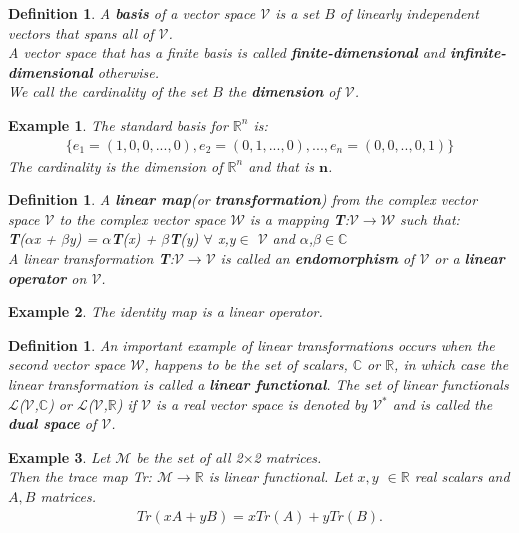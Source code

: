 \documentclass[12pt,a4paper]{article}
\newtheorem{defn}[thm]{Definition}
\newtheorem{exmp}{Example}[section]
\begin{document}
\begin{defn}
A \textbf{basis} of a vector space $\mathcal{V}$ is a set $B$ of linearly independent vectors that spans all of $\mathcal{V}$. \\A vector space that has a finite basis is called \textbf{finite-dimensional} and \textbf{infinite-dimensional} otherwise. \\We call the cardinality of the set $B$ the \textbf{dimension} of $\mathcal{V}$.
\end{defn}
\begin{exmp}
The standard basis for $\mathbb{R}^n$ is:
\begin{align*}
\{ e_1 = (1, 0, 0, ... , 0), e_2 = (0, 1, ... , 0), ... , e_n=(0,0,..,0, 1) \}
\end{align*}
The cardinality is the dimension of $\mathbb{R}^n$ and that is $\textbf{n}$.
\end{exmp}
\begin{defn}
A \textbf{linear map}(or \textbf{transformation}) from the complex vector space $\mathcal{V}$ to the complex vector space $\mathcal{W}$ is a mapping \textbf{T}:$\mathcal{V}$$\to$$\mathcal{W}$ such that:\\
\hspace{1cm} \textbf{T}($\alpha$x + $\beta$y) = $\alpha$\textbf{T}(x) + $\beta$\textbf{T}(y) $\forall$ x,y$\in$ $\mathcal{V}$ and $\alpha$,$\beta$$\in$$\mathbb{C}$\\
A linear transformation \textbf{T}:$\mathcal{V}$$\to$$\mathcal{V}$ is called an \textbf{endomorphism} of $\mathcal{V}$ or a \textbf{linear operator} on $\mathcal{V}$.
\end{defn}
\begin{exmp}
The identity map is a linear operator.
\end{exmp}
\begin{defn}
An important example of linear transformations occurs when the second vector space $\mathcal{W}$, happens to be the set of scalars, $\mathbb{C}$ or $\mathbb{R}$, in which case the linear transformation is called a \textbf{linear functional}. The set of linear functionals $\mathcal{L}$($\mathcal{V}$,$\mathbb{C}$) or $\mathcal{L}$($\mathcal{V}$,$\mathbb{R}$) if $\mathcal{V}$ is a real vector space is denoted by $\mathcal{V}$$^*$ and is called the \textbf{dual space} of $\mathcal{V}$.
\end{defn}
\begin{exmp}
Let $\mathcal{M}$ be the set of all 2$\times$2 matrices.\\
Then the trace map Tr: $\mathcal{M} \to \mathbb{R}$ is linear functional. Let $x, y$ $\in \mathbb{R}$ real scalars and $A, B$ matrices.
\begin{align*}
Tr(xA + yB) = xTr(A) + yTr(B).
\end{align*}
\end{exmp}
\end{document}
